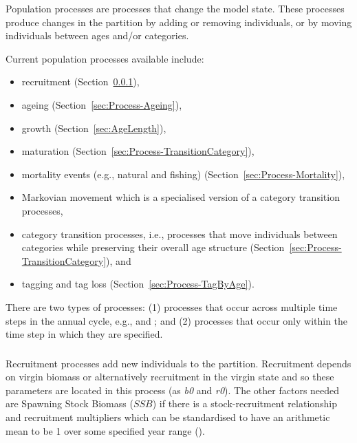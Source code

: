 
Population processes are processes that change the model state. These processes produce changes in the partition by adding or removing individuals, or by moving individuals between ages and/or categories.

Current population processes available include:

\begin{itemize}
\item recruitment (Section~\ref{sec:Process-Recruitment}),
\item ageing (Section~\ref{sec:Process-Ageing}),
\item growth (Section~\ref{sec:AgeLength}),
\item maturation (Section~\ref{sec:Process-TransitionCategory}),
\item mortality events (e.g., natural and fishing) (Section~\ref{sec:Process-Mortality}), 
\item Markovian movement which is a specialised version of a category transition processes, 
\item category transition processes, i.e., processes that move individuals between categories while preserving their overall age structure (Section~\ref{sec:Process-TransitionCategory}), and
\item tagging and tag loss (Section~\ref{sec:Process-TagByAge}).
\end{itemize}

There are two types of processes: (1) processes that occur across multiple time steps in the annual cycle, e.g.,  and ; and (2) processes that occur only within the time step in which they are specified.

\subsubsection{}\label{sec:Process-Recruitment}

Recruitment processes  add new individuals to the partition. Recruitment depends on virgin biomass or alternatively recruitment in the virgin state and so these parameters are located in this process (as \textit{b0} and \textit{r0}). The other factors needed are Spawning Stock Biomass ($SSB$) if there is a stock-recruitment relationship and recruitment multipliers which can be standardised to have an arithmetic mean to be 1 over some specified year range ().

